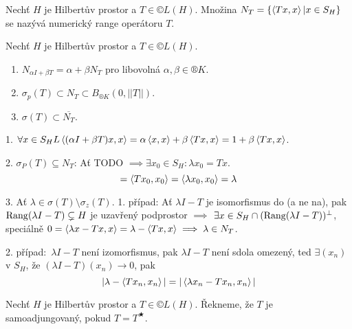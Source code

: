 \documentclass[12pt]{article}					%
\begin{document}
\begin{definice}
	Nechť $H$ je Hilbertův prostor a $T \in ©L(H)$. Množina $N_T = \{\left\langle Tx, x\right\rangle | x \in S_H\}$ se nazývá numerický range operátoru $T$.
\end{definice}

\begin{tvrzeni}
	Nechť $H$ je Hilbertův prostor a $T \in ©L(H)$.

	\begin{enumerate}
		\item $N_{\alpha I + \beta T} = \alpha + \beta N_T$ pro libovolná $\alpha, \beta \in ®K$.
		\item $\sigma_p(T) \subset N_T \subset B_{®K}(0, ||T||)$.
		\item $\sigma(T) \subset \overline{N_T}$.
	\end{enumerate}

	\begin{dukazin}
		1. $\forall x \in S_HL \left\langle(\alpha I + \beta T)x, x\right\rangle = \alpha\left\langle x, x\right\rangle + \beta\left\langle Tx, x\right\rangle = 1 + \beta\left\langle Tx, x\right\rangle$.

		2. $\sigma_P(T) \subseteq N_T$: Ať TODO $\implies \exists x_0 \in S_H: \lambda x_0 = Tx$.
		$$ = \left\langle Tx_0, x_0\right\rangle = \left\langle\lambda x_0, x_0\right\rangle = \lambda $$

		3. Ať $\lambda \in \sigma(T) \setminus \sigma_z(T)$. 1. případ: Ať $\lambda I - T$ je isomorfismus do (a ne na), pak $\operatorname{Rang}(\lambda I - T) \subsetneq H$ je uzavřený podprostor $\implies$ $\exists x \in S_H \cap (\operatorname{Rang}(\lambda I - T))^\perp$, speciálně $0 = \left\langle\lambda x - Tx, x\right\rangle = \lambda - \left\langle Tx, x\right\rangle \implies \lambda \in N_T$.

		2. případ: $\lambda I - T$ není izomorfismus, pak $\lambda I - T$ není sdola omezený, ted $\exists (x_n)$ v $S_H$, že $(\lambda I - T)(x_n) \rightarrow 0$, pak
		$$ |\lambda - \left\langle Tx_n, x_n\right\rangle| = |\left\langle\lambda x_n - Tx_n, x_n\right\rangle| $$
	\end{dukazin}
\end{tvrzeni}

\begin{definice}
	Nechť $H$ je Hilbertův prostor a $T \in ©L(H)$. Řekneme, že $T$ je samoadjungovaný, pokud $T = T^\bigstar$.
\end{definice}
\end{document}
